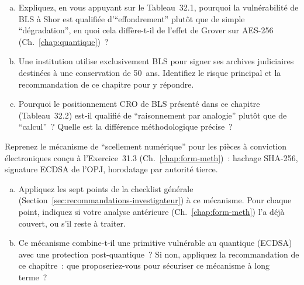 \bigskip

\begin{boxexo}[title={\ding{45}\quad Exercice~32.1. Cryptanalyse appliquée \niveaubase}]
\begin{enumerate}[(a)]
    \item Expliquez, en vous appuyant sur le Tableau~32.1, pourquoi
          la vulnérabilité de BLS à Shor est qualifiée
          d'``effondrement'' plutôt que de simple
          ``dégradation'', en quoi cela diffère-t-il de l'effet
          de Grover sur AES-256 (Ch.~\ref{chap:quantique})~?
    \item Une institution utilise exclusivement BLS pour signer ses
          archives judiciaires destinées à une conservation de
          50~ans. Identifiez le risque principal et la recommandation
          de ce chapitre pour y répondre.
    \item Pourquoi le positionnement CRO de BLS présenté dans ce
          chapitre (Tableau~32.2) est-il qualifié de ``raisonnement
          par analogie'' plutôt que de ``calcul''~? Quelle est la
          différence méthodologique précise~?
\end{enumerate}
\end{boxexo}

\begin{boxexo}[title={\ding{45}\quad Exercice~32.2. Checklist appliquée à un cas du cours \niveaumoyen}]
Reprenez le mécanisme de ``scellement numérique'' pour les pièces à
conviction électroniques conçu à l'Exercice~31.3
(Ch.~\ref{chap:form-meth})~: hachage SHA-256, signature ECDSA de
l'OPJ, horodatage par autorité tierce.
\begin{enumerate}[(a)]
    \item Appliquez les sept points de la checklist générale
          (Section~\ref{sec:recommandations-investigateur}) à ce
          mécanisme. Pour chaque point, indiquez si votre analyse
          antérieure (Ch.~\ref{chap:form-meth}) l'a déjà couvert,
          ou s'il reste à traiter.
    \item Ce mécanisme combine-t-il une primitive vulnérable au
          quantique (ECDSA) avec une protection post-quantique~?
          Si non, appliquez la recommandation de ce chapitre~:
          que proposeriez-vous pour sécuriser ce mécanisme à long
          terme~?
\end{enumerate}
\end{boxexo}

